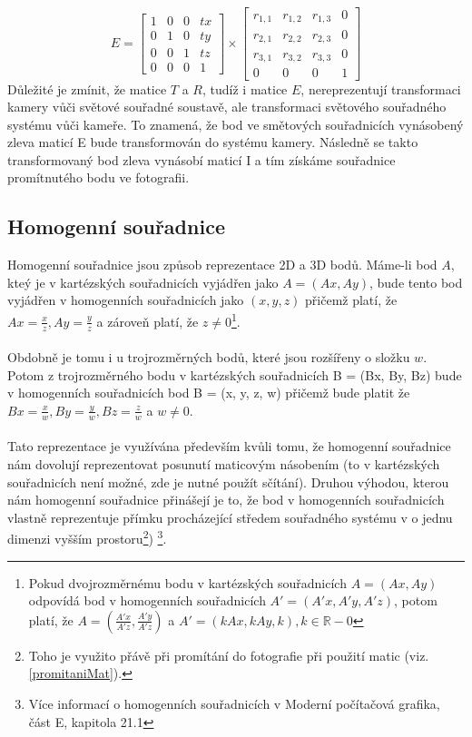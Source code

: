 \documentclass[11pt,twoside,a4paper]{book}
\begin{document}
 $$
 E
 =
  \begin{bmatrix}
  1 & 0 & 0 & tx\\
  0 & 1 & 0 & ty\\
  0 & 0 & 1 & tz\\
  0 & 0 & 0 & 1
  \end{bmatrix}
  \times
  \begin{bmatrix}
  r_{1,1} & r_{1,2} & r_{1,3} & 0\\
  r_{2,1} & r_{2,2} & r_{2,3} & 0\\
  r_{3,1} & r_{3,2} & r_{3,3} & 0\\
  0 & 0 & 0 & 1
  \end{bmatrix}
 $$
 Důležité je zmínit, že matice $T$ a $R$, tudíž i matice $E$, nereprezentují transformaci kamery vůči světové souřadné soustavě, ale transformaci světového souřadného systému vůči kameře. To znamená, že bod ve smětových souřadnicích vynásobený zleva maticí E bude transformován do systému kamery. Následně se takto transformovaný bod zleva vynásobí maticí I a tím získáme souřadnice promítnutého bodu ve fotografii.
 
\subsection{Homogenní souřadnice}
\label{homog}
Homogenní souřadnice\cite{Zara} jsou způsob reprezentace 2D a 3D bodů. Máme-li bod $A$, kteý je v kartézských souřadnicích vyjádřen jako $A = (Ax ,Ay)$, bude tento bod vyjádřen v homogenních souřadnicích jako $(x, y, z)$ přičemž platí, že $Ax = \frac{x}{z},Ay = \frac{y}{z}$ a zároveň platí, že $z \neq 0$\footnote{Pokud dvojrozměrnému bodu v kartézských souřadnicích $A = (Ax, Ay)$ odpovídá bod v homogenních souřadnicích $A' = (A'x, A'y, A'z)$, potom platí, že $A = (\frac{A'x}{A'z},\frac{A'y}{A'z})$ a $A' = (kAx, kAy, k), k\in\mathbb{R}-{0}$}. 
\paragraph{}
Obdobně je tomu i u trojrozměrných bodů, které jsou rozšířeny o složku $w$. Potom z trojrozměrného bodu v kartézských souřadnicích B = (Bx, By, Bz) bude v homogenních souřadnicích bod B = (x, y, z, w) přičemž bude platit že $Bx = \frac{x}{w},By = \frac{y}{w},Bz = \frac{z}{w}$ a $w \neq 0$.
\paragraph{}
Tato reprezentace je využívána především kvůli tomu, že homogenní souřadnice nám dovolují reprezentovat posunutí maticovým násobením (to v kartézských souřadnicích není možné, zde je nutné použít sčítání). Druhou výhodou, kterou nám homogenní souřadnice přinášejí je to, že bod v homogenních souřadnicích vlastně reprezentuje přímku procházející středem souřadného systému v o jednu dimenzi vyšším prostoru\footnote{Toho je využito přávě při promítání do fotografie při použití matic (viz. \ref{promitaniMat}).}) \footnote{Více informací o homogenních souřadnicích v Moderní počítačová grafika\cite{Zara}, část E, kapitola 21.1}.  
 
\end{document}
